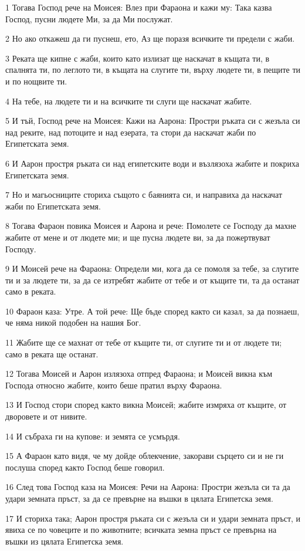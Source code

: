 \par 1 Тогава Господ рече на Моисея: Влез при Фараона и кажи му: Така казва Господ, пусни людете Ми, за да Ми послужат.
\par 2 Но ако откажеш да ги пуснеш, ето, Аз ще поразя всичките ти предели с жаби.
\par 3 Реката ще кипне с жаби, които като излизат ще наскачат в къщата ти, в спалнята ти, по леглото ти, в къщата на слугите ти, върху людете ти, в пещите ти и по нощвите ти.
\par 4 На тебе, на людете ти и на всичките ти слуги ще наскачат жабите.
\par 5 И тъй, Господ рече на Моисея: Кажи на Аарона: Простри ръката си с жезъла си над реките, над потоците и над езерата, та стори да наскачат жаби по Египетската земя.
\par 6 И Аарон простря ръката си над египетските води и възлязоха жабите и покриха Египетската земя.
\par 7 Но и магьосниците сториха същото с баянията си, и направиха да наскачат жаби по Египетската земя.
\par 8 Тогава Фараон повика Моисея и Аарона и рече: Помолете се Господу да махне жабите от мене и от людете ми; и ще пусна людете ви, за да пожертвуват Господу.
\par 9 И Моисей рече на Фараона: Определи ми, кога да се помоля за тебе, за слугите ти и за людете ти, за да се изтребят жабите от тебе и от къщите ти, та да останат само в реката.
\par 10 Фараон каза: Утре. А той рече: Ще бъде според както си казал, за да познаеш, че няма никой подобен на нашия Бог.
\par 11 Жабите ще се махнат от тебе от къщите ти, от слугите ти и от людете ти; само в реката ще останат.
\par 12 Тогава Моисей и Аарон излязоха отпред Фараона; и Моисей викна към Господа относно жабите, които беше пратил върху Фараона.
\par 13 И Господ стори според както викна Моисей; жабите измряха от къщите, от дворовете и от нивите.
\par 14 И събраха ги на купове: и земята се усмърдя.
\par 15 А Фараон като видя, че му дойде облекчение, закорави сърцето си и не ги послуша според както Господ беше говорил.
\par 16 След това Господ каза на Моисея: Речи на Аарона: Простри жезъла си та да удари земната пръст, за да се превърне на въшки в цялата Египетска земя.
\par 17 И сториха така; Аарон простря ръката си с жезъла си и удари земната пръст, и явиха се по човеците и по животните; всичката земна пръст се превърна на въшки из цялата Египетска земя.
